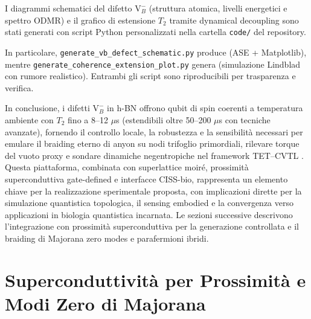 \documentclass[11pt,a4paper]{article}
\let\oldcite\cite
\renewcommand{\cite}{\protect\oldcite}
\theoremstyle{plain}
\theoremstyle{definition}
\begin{document}
I diagrammi schematici del difetto $\mathrm{V}_B^-$ (struttura atomica, livelli energetici e spettro ODMR) e il grafico di estensione $T_2$ tramite dynamical decoupling sono stati generati con script Python personalizzati nella cartella \texttt{code/} del repository. 

\vspace{0.3cm}

In particolare, \texttt{generate\_vb\_defect\_schematic.py} produce (ASE + Matplotlib), 
mentre \texttt{generate\_coherence\_extension\_plot.py} genera (simulazione Lindblad con rumore realistico). Entrambi gli script sono riproducibili per trasparenza e verifica.

\vspace{0.3cm}

In conclusione, i difetti $\mathrm{V}_B^-$ in h-BN offrono qubit di spin coerenti a temperatura ambiente con $T_2$ fino a 8–12 $\mu$s (estendibili oltre 50–200 $\mu$s con tecniche avanzate), fornendo il controllo locale, la robustezza e la sensibilità necessari per emulare il braiding eterno di anyon su nodi trifoglio primordiali, rilevare torque del vuoto proxy e sondare dinamiche negentropiche nel framework TET--CVTL \cite{Gottscholl2021, Ramsay2023, Rizzato2023, Bourrellier2025}. Questa piattaforma, combinata con superlattice moiré, prossimità superconduttiva gate-defined e interfacce CISS-bio, rappresenta un elemento chiave per la realizzazione sperimentale proposta, con implicazioni dirette per la simulazione quantistica topologica, il sensing embodied e la convergenza verso applicazioni in biologia quantistica incarnata. Le sezioni successive descrivono l'integrazione con prossimità superconduttiva per la generazione controllata e il braiding di Majorana zero modes e parafermioni ibridi.







\section{Superconduttività per Prossimità e Modi Zero di Majorana}
\end{document}
